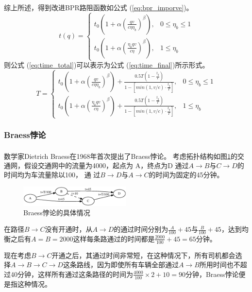 \documentclass[fontset=windows,a4paper,12pt]{ctexart}
\newcommand{\upcite}[1]{\textsuperscript{\textsuperscript{\cite{#1}}}}
\renewcommand{\eqref}[1]{公式 (\ref{#1})}
\begin{document}
			综上所述，得到改进BPR路阻函数如\eqref{eq:bpr_imporve}。
			\begin{equation}
				t(q)=\left\lbrace
				\begin{array}{ll}
					t_0(1+\alpha(\frac{qv}{c\eta\eta_b})^\beta), & 0\leq\eta_b\leq1\\
					t_0(1+\alpha(\frac{\eta_bqv}{c\eta})^\beta), & 1\leq\eta_b
				\end{array}	
				\right.
				\label{eq:bpr_imporve}
			\end{equation}			
			则\eqref{eq:time_total}可以表示为\eqref{eq:time_final}所示形式。
			\begin{equation}
				T=\left\lbrace
				\begin{array}{ll}
					t_0(1+\alpha(\frac{qv}{c\eta\eta_b})^\beta)+\frac{0.5T(1-\frac{t_g}{T})}{1-[min(1,v/c)\cdot{\frac{t_g}{T}}]}, & 0\leq\eta_b\leq1\\
					t_0(1+\alpha(\frac{\eta_bqv}{c\eta})^\beta)+\frac{0.5T(1-\frac{t_g}{T})}{1-[min(1,v/c)\cdot{\frac{t_g}{T}}]}, & 1\leq\eta_b
				\end{array}	
				\right.
				\label{eq:time_final}
			\end{equation}
		\subsubsection{Braess悖论}
			数学家Dietrich Braess在1968年首次提出了Braess悖论\upcite{Braess1968Ü}。
			考虑拓扑结构如图\ref{fig:braess}的交通网，假设交通网中的流量为4000，起点为	A，终点为D
			通过$ A \rightarrow B $与$ C \rightarrow D $的时间均为车流量除以100，	通
			过$ B \rightarrow D $与$ A \rightarrow C $的时间为固定的45分钟。
			\begin{figure}[!htbp]
				\centering
				\includegraphics[width=0.5\textwidth]{pic/braess.eps}
				\caption{Braess悖论的具体情况}
				\label{fig:braess}
			\end{figure}
			在路径$ B \rightarrow C $没有开通时，从$ A \rightarrow D $的通过时间分别为$ \frac{A}{100}+45 $与$ \frac{B}
			{100} + 45 $，达到均衡之后有$ A=B=2000 $这样每条路通过的时间都是$ \frac{2000}{100}
			+45=65 $分钟。
		
			现在考虑$ B \rightarrow C $开通之后，其通过时间非常短，在这种情况下，所有司机都会选择$ A \rightarrow B \rightarrow C \rightarrow D $这条路线，因为即使所有车辆全部通过$ A \rightarrow B $所用时间也不超过40分钟，这样所有通过这条路径的时间为$ \frac{4000}{100}\times 2+10=90$分钟，Braess悖论便是指这种情况。		
\end{document}
